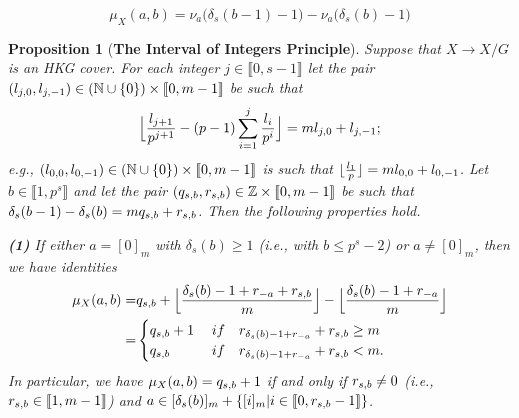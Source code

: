 \documentclass[10pt,a4paper]{amsart}
\newtheorem{proposition}{Proposition}
\def\l{\textup{l}}
\def\q{\textup{q}}
\def\r{\textup{r}}
\begin{document}
\begin{equation}\label{EQ57}
\mu_X(a,b)=\nu_a\bigl(\delta_s(b-1)-1\bigr)-\nu_a\bigl(\delta_s(b)-1\bigr)
\end{equation}

\begin{proposition}[{\bf The Interval of Integers Principle}]
\label{P8}
Suppose that $X\rightarrow X/G$ is an HKG cover. For each integer $j\in\llbracket0,s-1\rrbracket$ let the pair $(\l_{j,0},\l_{j,-1})\in (\mathbb N\cup\{0\})\times\llbracket0,m-1\rrbracket$ be such that 
$$\Big\lfloor\frac{l_{j+1}}{p^{j+1}}-(p-1)\sum_{i=1}^j\frac{l_i}{p^i}\Big\rfloor=m\l_{j,0}+\l_{j,-1};$$
e.g., $(\l_{0,0},\l_{0,-1})\in (\mathbb N\cup\{0\})\times\llbracket0,m-1\rrbracket$ is such that $\lfloor\frac{l_1}{p}\rfloor=m\l_{0,0}+\l_{0,-1}$. Let $b\in\llbracket1,p^s\rrbracket$ and let the pair $(\q_{s,b},\r_{s,b})\in \mathbb Z\times\llbracket0,m-1\rrbracket$ be such that $\delta_s(b-1)-\delta_s(b)=m\q_{s,b}+\r_{s,b}$.  Then the following properties hold.

\medskip
{\bf (1)} If either $a=[0]_m$ with $\delta_s(b)\ge 1$ (i.e., with $b\le p^s-2$) or $a\neq [0]_m$, then we have identities
\begin{equation}\label{EQ58}
\begin{split}\mu_X(a,b)=&\q_{s,b}+\Big\lfloor\frac{\delta_s(b)-1+\r_{-a}+\r_{s,b}}{m}\Big\rfloor-\Big\lfloor\frac{\delta_s(b)-1+\r_{-a}}{m}\Big\rfloor\\
=&\begin{cases}\q_{s,b}+1\quad\;\textup{if}\quad \r_{\delta_s(b)-1+\r_{-a}}+\r_{s,b}\ge m\\
\q_{s,b}\quad\quad\quad\textup{if}\quad \r_{\delta_s(b)-1+\r_{-a}}+\r_{s,b}<m.\end{cases}
\end{split}
\end{equation}
In particular, we have $\mu_X(a,b)=\q_{s,b}+1$ if and only if $\r_{s,b}\neq 0$ (i.e., $\r_{s,b}\in\llbracket1,m-1\rrbracket$) and $a\in [\delta_s(b)]_m+\{[i]_m|i\in\llbracket0,\r_{s,b}-1\rrbracket\}$.


\end{proposition}
\end{document}
